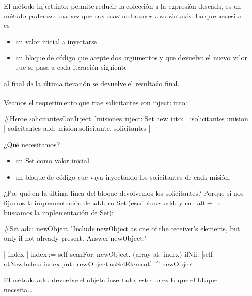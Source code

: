 \documentclass[a4paper,12pt]{book}
\begin{document}
El método inject:into: permite reducir la colección a la expresión deseada, es un método poderoso una vez que
nos acostumbramos a su sintaxis. Lo que necesita es

\begin{itemize}
 \item un valor inicial a inyectarse 
 \item un bloque de código que acepte dos argumentos y que devuelva el nuevo valor que se pasa a cada iteración siguiente
\end{itemize}

al final de la última iteración se devuelve el resultado final.
\\
\\
Veamos el requerimiento que trae solicitantes con inject: into:

\begin{code}
#Heroe
solicitantesConInject
   ^misiones inject: Set new 
             into: [ :solicitantes :mision | 
	             solicitantes add: mision solicitante. 
	             solicitantes  ] 
\end{code}

¿Qué necesitamos?
\\
\begin{itemize}
 \item un Set como valor inicial
 \item un bloque de código que vaya inyectando los solicitantes de cada misión. 
\end{itemize}

¿Por qué en la última línea del bloque devolvemos los solicitantes? Porque si nos fijamos la implementación de
add: en Set (escribimos add: y con alt + m buscamos la implementación de Set):

\begin{code}
#Set
add: newObject
	"Include newObject as one of the receiver's elements, but only if
	not already present. Answer newObject."

	| index |
	index := self scanFor: newObject.
	(array at: index) ifNil: [self atNewIndex: index put: newObject asSetElement].
	^ newObject
\end{code}

El método add: devuelve el objeto insertado, esto no es lo que el bloque necesita...

\begin{code}
\end{code}
\end{document}
